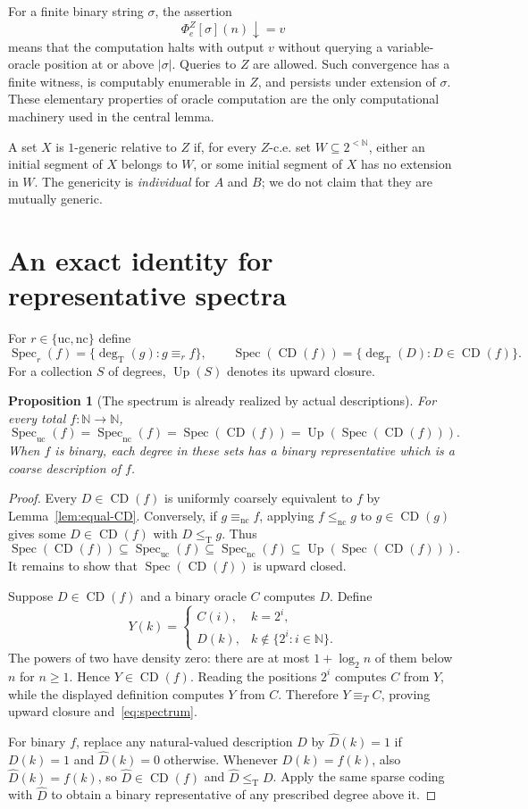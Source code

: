 \documentclass[11pt,a4paper]{article}
\newcommand{\N}{\mathbb N}
\newcommand{\strings}{2^{<\N}}
\newcommand{\leT}{\leq_{\mathrm T}}
\newcommand{\degT}{\operatorname{deg}_{\mathrm T}}
\newcommand{\CD}{\operatorname{CD}}
\newcommand{\Spec}{\operatorname{Spec}}
\newcommand{\Up}{\operatorname{Up}}
\newcommand{\nc}{\mathrm{nc}}
\newcommand{\uc}{\mathrm{uc}}
\newcommand{\phiZ}[2]{\Phi_{#1}^{Z}[#2]}
\newtheorem{proposition}[theorem]{Proposition}
\theoremstyle{definition}\newtheorem{definition}[theorem]{Definition}
\theoremstyle{remark}\newtheorem{remark}[theorem]{Remark}
\begin{document}
For a finite binary string $\sigma$, the assertion
\[
                 \phiZ{e}{\sigma}(n)\downarrow=v
\]
means that the computation halts with output $v$ without querying a variable-oracle position at or above $|\sigma|$. Queries to $Z$ are allowed. Such convergence has a finite witness, is computably enumerable in $Z$, and persists under extension of $\sigma$. These elementary properties of oracle computation are the only computational machinery used in the central lemma.

A set $X$ is $1$-generic relative to $Z$ if, for every $Z$-c.e. set $W\subseteq\strings$, either an initial segment of $X$ belongs to $W$, or some initial segment of $X$ has no extension in $W$. The genericity is \emph{individual} for $A$ and $B$; we do not claim that they are mutually generic.

\section{An exact identity for representative spectra}
\label{sec:spectrum}

For $r\in\{\uc,\nc\}$ define
\[
 \Spec_r(f)=\{\degT(g):g\equiv_r f\},\qquad
 \Spec(\CD(f))=\{\degT(D):D\in\CD(f)\}.
\]
For a collection $S$ of degrees, $\Up(S)$ denotes its upward closure.

\begin{proposition}[The spectrum is already realized by actual descriptions]
\label{prop:spectrum}
For every total $f:\N\to\N$,
\begin{equation}\label{eq:spectrum}
 \Spec_\uc(f)=\Spec_\nc(f)
 =\Spec(\CD(f))=\Up(\Spec(\CD(f))).
\end{equation}
When $f$ is binary, each degree in these sets has a binary representative which is a coarse description of $f$.
\end{proposition}
\begin{proof}
Every $D\in\CD(f)$ is uniformly coarsely equivalent to $f$ by Lemma~\ref{lem:equal-CD}. Conversely, if $g\equiv_\nc f$, applying $f\le_\nc g$ to $g\in\CD(g)$ gives some $D\in\CD(f)$ with $D\leT g$. Thus
\[
 \Spec(\CD(f))\subseteq\Spec_\uc(f)
 \subseteq\Spec_\nc(f)\subseteq\Up(\Spec(\CD(f))).
\]
It remains to show that $\Spec(\CD(f))$ is upward closed.

Suppose $D\in\CD(f)$ and a binary oracle $C$ computes $D$. Define
\[
 Y(k)=
 \begin{cases}
 C(i),&k=2^i,\\
 D(k),&k\notin\{2^i:i\in\N\}.
 \end{cases}
\]
The powers of two have density zero: there are at most $1+\log_2 n$ of them below $n$ for $n\ge1$. Hence $Y\in\CD(f)$. Reading the positions $2^i$ computes $C$ from $Y$, while the displayed definition computes $Y$ from $C$. Therefore $Y\equiv_T C$, proving upward closure and~\eqref{eq:spectrum}.

For binary $f$, replace any natural-valued description $D$ by $\widehat D(k)=1$ if $D(k)=1$ and $\widehat D(k)=0$ otherwise. Whenever $D(k)=f(k)$, also $\widehat D(k)=f(k)$, so $\widehat D\in\CD(f)$ and $\widehat D\leT D$. Apply the same sparse coding with $\widehat D$ to obtain a binary representative of any prescribed degree above it.
\end{proof}
\end{document}
